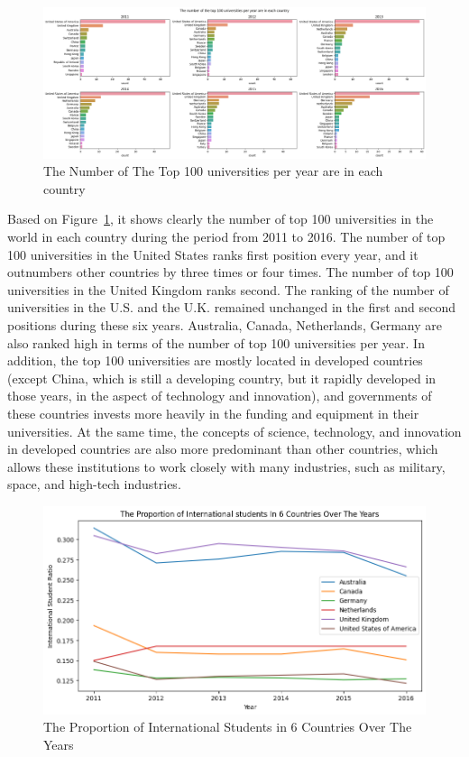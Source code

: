 \documentclass[a4paper]{article}
\begin{document}
\FloatBarrier
\begin{figure}[h]
  \centering
  \includegraphics[width=1.0\textwidth]{images/HPlot1.png}
  \caption{The Number of The Top 100 universities per year are in each country}
  \label{fig:4}
\end{figure}
\FloatBarrier
Based on Figure~\ref{fig:4}, it shows clearly the number of top 100 universities in the world in each country during the period from 2011 to 2016. The number of top 100 universities in the United States ranks first position every year, and it outnumbers other countries by three times or four times. The number of top 100 universities in the United Kingdom ranks second. The ranking of the number of universities in the U.S. and the U.K. remained unchanged in the first and second positions during these six years. Australia, Canada, Netherlands, Germany are also ranked high in terms of the number of top 100 universities per year. In addition, the top 100 universities are mostly located in developed countries (except China, which is still a developing country, but it rapidly developed in those years, in the aspect of technology and innovation), and governments of these countries invests more heavily in the funding and equipment in their universities. At the same time, the concepts of science, technology, and innovation in developed countries are also more predominant than other countries, which allows these institutions to work closely with many industries, such as military, space, and high-tech industries. 
\FloatBarrier
\begin{figure}[h]
  \centering
  \includegraphics[scale=0.6]{images/HPlot2.png}
  \caption{The Proportion of International Students in 6 Countries Over The Years}
  \label{fig:5}
\end{figure}
\end{document}

